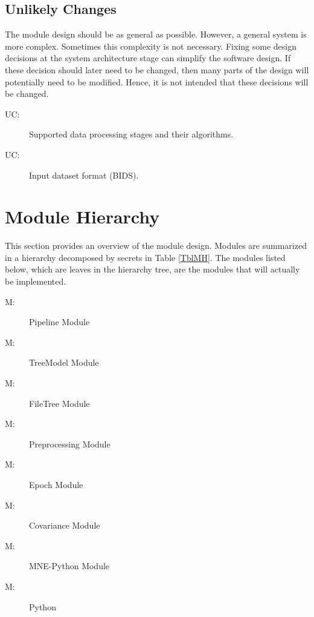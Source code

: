 \documentclass[12pt, titlepage]{article}
\newcounter{ucnum}
\newcommand{\uctheucnum}{UC\theucnum}
\newcounter{mnum}
\newcommand{\mthemnum}{M\themnum}
\begin{document}
\subsection{Unlikely Changes} \label{SecUchange}


The module design should be as general as possible. However, a general system is more complex. Sometimes this complexity is not necessary. Fixing some design decisions at the system architecture stage can simplify the software design. If these decision should later need to be changed, then many parts of the design will potentially need to be modified. Hence, it is not intended that these decisions will be changed.


\begin{description}
    \item[ \uctheucnum \label{ucStages}:] Supported data processing stages and their algorithms.
    \item[ \uctheucnum \label{ucBIDS}:] Input dataset format (BIDS).
\end{description}








\section{Module Hierarchy} \label{SecMH}


This section provides an overview of the module design. Modules are summarized in a hierarchy decomposed by secrets in Table \ref{TblMH}. The modules listed below, which are leaves in the hierarchy tree, are the modules that will actually be implemented.


\begin{description}
    \item [ \mthemnum \label{mPipleline}:] Pipeline Module
    \item [ \mthemnum \label{mTreeModel}:] TreeModel Module
    \item [ \mthemnum \label{mFileTree}:] FileTree Module
    \item [ \mthemnum \label{mPreprocessing}:] Preprocessing Module
    \item [ \mthemnum \label{mEpoch}:] Epoch Module
    \item [ \mthemnum \label{mCovariance}:] Covariance Module
    \item [ \mthemnum \label{mMNE}:] MNE-Python Module
    \item [ \mthemnum \label{mPython}:] Python
\end{description}
\end{document}
